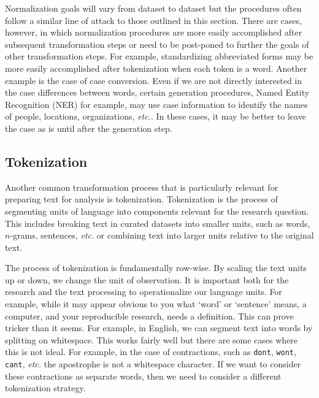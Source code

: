 \documentclass[
  letterpaper,
  DIV=11,
  numbers=noendperiod]{scrreprt}
\theoremstyle{definition}
\theoremstyle{remark}
\begin{document}
Normalization goals will vary from dataset to dataset but the procedures
often follow a similar line of attack to those outlined in this section.
There are cases, however, in which normalization procedures are more
easily accomplished after subsequent transformation steps or need to be
post-poned to further the goals of other transformation steps. For
example, standardizing abbreviated forms may be more easily accomplished
after tokenization when each token is a word. Another example is the
case of case conversion. Even if we are not directly interested in the
case differences between words, certain generation procedures, Named
Entity Recognition (NER) for example, may use case information to
identify the names of people, locations, organizations, \emph{etc.}. In
these cases, it may be better to leave the case as is until after the
generation step.

\subsection{Tokenization}\label{sec-td-tokenization}

Another common transformation process that is particularly relevant for
preparing text for analysis is tokenization. Tokenization is the process
of segmenting units of language into components relevant for the
research question. This includes breaking text in curated datasets into
smaller units, such as words, \(n\)-grams, sentences, \emph{etc.} or
combining text into larger units relative to the original text.

The process of tokenization is fundamentally row-wise. By scaling the
text units up or down, we change the unit of observation. It is
important both for the research and the text processing to
operationalize our language units. For example, while it may appear
obvious to you what `word' or `sentence' means, a computer, and your
reproducible research, needs a definition. This can prove tricker than
it seems. For example, in English, we can segment text into words by
splitting on whitespace. This works fairly well but there are some cases
where this is not ideal. For example, in the case of contractions, such
as \texttt{don\textquotesingle{}t}, \texttt{won\textquotesingle{}t},
\texttt{can\textquotesingle{}t}, \emph{etc.} the apostrophe is not a
whitespace character. If we want to consider these contractions as
separate words, then we need to consider a different tokenization
strategy.
\end{document}
